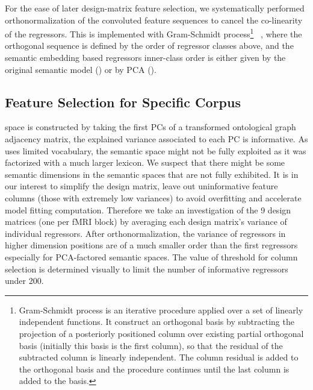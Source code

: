 For the ease of later design-matrix feature selection, we systematically performed orthonormalization of the convoluted feature sequences to cancel the co-linearity of the regressors. This is implemented with Gram-Schmidt process\footnote{Gram-Schmidt process is an iterative procedure applied over a set of linearly independent functions. It construct an orthogonal basis by subtracting the projection of a posteriorly positioned column over existing partial orthogonal basis (initially this basis is the first column), so that the residual of the subtracted column is linearly independent. The column residual is added to the orthogonal basis and the procedure continues until the last column is added to the basis.}~\parencite{GramSchmidtProcess2019} , where the orthogonal sequence is defined by the order of regressor classes above, and the semantic embedding based regressors inner-class order is either given by the original semantic model () or by PCA (). 

\subsection{Feature Selection for Specific Corpus}

 space is constructed by taking the first PCs of a transformed ontological graph adjacency matrix, the explained variance associated to each PC is informative. As  uses limited vocabulary, the semantic space might not be fully exploited as it was factorized with a much larger lexicon. We suspect that there might be some semantic dimensions in the semantic spaces that are not fully exhibited. It is in our interest to simplify the design matrix, leave out uninformative feature columns (those with extremely low variances) to avoid overfitting and accelerate model fitting computation. Therefore we take an investigation of the 9 design matrices (one per fMRI block) by averaging each design matrix's variance of individual regressors. After orthonormalization, the variance of regressors in higher dimension positions are of a much smaller order than the first regressors especially for PCA-factored semantic spaces. The value of threshold for column selection is determined visually to limit the number of informative regressors under 200.

